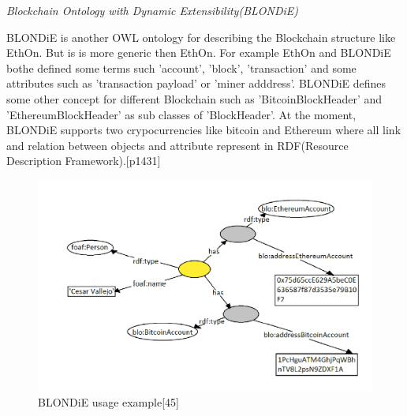 \textit{Blockchain Ontology with Dynamic Extensibility(BLONDiE)}
	
BLONDiE is another OWL ontology for describing the
Blockchain structure like EthOn. But is is more generic then EthOn. For example EthOn and BLONDiE bothe defined some terms such 'account', 'block', 'transaction' and some attributes such as 'transaction payload' or 'miner adddress'. BLONDiE defines some other concept for different Blockchain such as 'BitcoinBlockHeader' and 'EthereumBlockHeader' as sub classes of 'BlockHeader'. At the moment, BLONDiE supports two crypocurrencies like bitcoin and Ethereum where all link and relation between objects and attribute represent in RDF(Resource Description Framework).[p1431]
\begin{center}
	\begin{figure}[htb!]
		
		\begin{minipage}{0.55\linewidth}
			\centering
			\includegraphics[width=1.95\textwidth]{images/chap02_BLONDiE.png}
		\end{minipage}
		\caption[BLONDiE]{BLONDiE usage example[45]}
		
		
	\end{figure}
	
\end{center}

